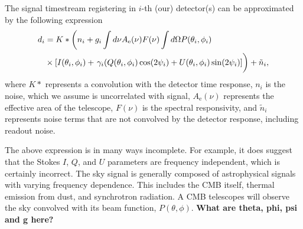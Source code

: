 The signal timestream registering in \textbf{$i$}-th (our) detector(s) can be approximated by the following expression
\begin{equation}
\begin{split}
d _i &= K \ast \left( n_i + g_i \int d \nu A_\mathrm{e} (\nu) F(\nu) \int d\Omega P (\theta _i,\phi _i) \right. \\ 
&\times [I(\theta _i, \phi _i) + \left. \gamma _i (Q(\theta _i,\phi _i)\cos (2\psi _i) + U(\theta _i,\phi _i) \sin (2\psi _i) ]  \vphantom{\int } \right) + \tilde{n}_i,
\end{split}
\end{equation}
where $K \ast$ represents a convolution with the detector time response, $n_i$ is the noise, which we assume is uncorrelated with signal, $A_{\mathrm{e}} (\nu)$ represents the effective area of the telescope, $F(\nu)$ is the spectral responsivity, and $\tilde{n}_i$ represents noise terms that are not convolved by the detector response, including readout noise. 

The above expression is in many ways incomplete. For example, it does suggest that the Stokes $I$, $Q$, and $U$ parameters are frequency independent, which is certainly incorrect. The sky signal is generally composed of astrophysical signals with varying frequency dependence. This includes the CMB itself, thermal emission from dust, and synchrotron radiation. A CMB telescopes will observe the sky convolved with its beam function, $P(\theta, \phi)$. \textbf{What are theta, phi, psi and g here?}
